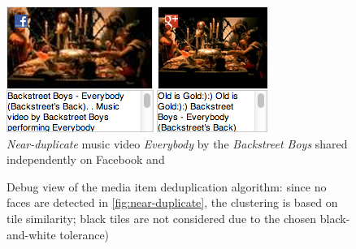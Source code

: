 \begin{figure}[!ht]
  \centering
  \includegraphics[width=0.9\linewidth]{./backstreetboys.png}
  \caption[\emph{Near-duplicate} music video \emph{Everybody} by the \emph{Backstreet Boys}]{\emph{Near-duplicate} music video \emph{Everybody} by the \emph{Backstreet Boys} shared independently on Facebook and \googleplus}
  \label{fig:near-duplicate}
\end{figure}

\begin{figure}[!ht]
  \centering
  \caption[Debug view of the media item deduplication algorithm]{Debug view of the media item deduplication algorithm:
  since no faces are detected in \autoref{fig:near-duplicate},
  the clustering is based on tile similarity;
  black tiles are not considered due to the chosen black-and-white tolerance)}
  \label{fig:algorithmdebugtilesimilarity}
\end{figure}

